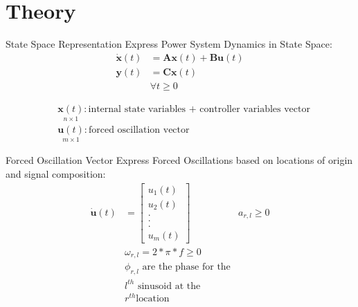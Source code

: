\section[Theory]{Theory}
\label{sec:lasso_theory}

\begin{frame}[fragile]{State Space Representation}
	Express Power System Dynamics in State Space:
	\begin{equation}
		\label{eq:ssr}
		\begin{align*}
			\dot{\textbf{x}}(t) &= 
			\textbf{A}\textbf{x}(t)
			+ \textbf{B}\textbf{u}(t)\\
			\textbf{y}(t) &= 
			\textbf{C}\textbf{x}(t)\\  
			& \forall t\geq0	
		\end{align*}
	\end{equation}
	
	\begin{align*}
		& \underset{\scriptscriptstyle n\times 1}{\textbf{x}(t)} : \text{internal state variables + controller variables vector}                                                                      \\
		& \underset{\scriptscriptstyle m\times 1}{\textbf{u}(t)} : \text{forced oscillation vector}
	\end{align*}
\end{frame}

\begin{frame}[fragile]{Forced Oscillation Vector}
	Express Forced Oscillations based on locations of origin and signal composition:
	\begin{equation}
		\label{eq:u1}
		\begin{align*}
			\dot{\textbf{u}}(t) &= \begin{bmatrix}
				u_1(t) \\
				u_2(t) \\
				. \\
				. \\
				. \\
				u_m(t)
			\end{bmatrix}
			& a_{r,l} \geq0 \\
			& \omega_{r,l} = 2*\pi*f \geq 0 \\
			& \phi_{r,l} \text{ are the phase for the} \\
			& l^{th} \text{ sinusoid at the} \\
			& r^{th} \text{location}
				
		\end{align*}
	\end{equation}
	
\end{frame}